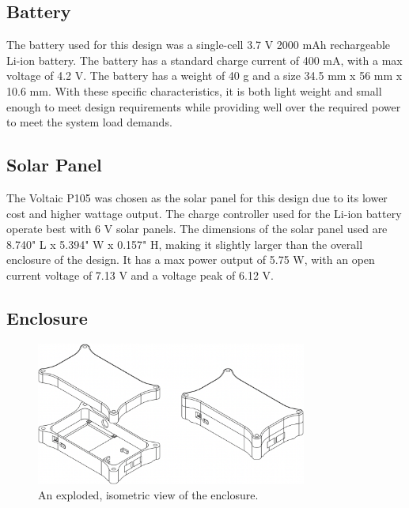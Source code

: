 \documentclass[conference]{IEEEtran}
\begin{document}
\subsection{Battery}
The battery used for this design was a single-cell 3.7 V 2000 mAh rechargeable Li-ion battery. The battery has a standard charge current of 400 mA, with a max voltage of 4.2 V. The battery has a weight of 40 g and a size 34.5 mm x 56 mm x 10.6 mm. With these specific characteristics, it is both light weight and small enough to meet design requirements while providing well over the required power to meet the system load demands.

\subsection{Solar Panel}
 The Voltaic P105 was chosen as the solar panel for this design due to its lower cost and higher wattage output. The charge controller used for the Li-ion battery operate best with 6 V solar panels. The dimensions of the solar panel used are 8.740" L x 5.394" W x 0.157" H, making it slightly larger than the overall enclosure of the design. It has a max power output of 5.75 W, with an open current voltage of 7.13 V and a voltage peak of 6.12 V. 
 
 \subsection{Enclosure}

\begin{figure}[t]
    \centering
    \includegraphics[width=3.5in]{img/enclosure_1.png}
    \caption{An exploded, isometric view of the enclosure.}
    \label{fig:enclosure-exploded}
\end{figure}
\end{document}
